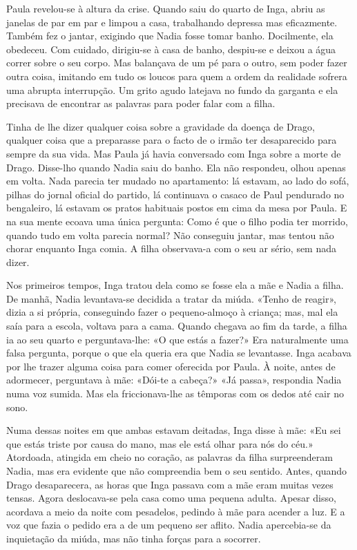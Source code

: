 Paula revelou-se à altura da crise. Quando saiu do quarto de Inga, abriu
as janelas de par em par e limpou a casa, trabalhando depressa mas
eficazmente. Também fez o jantar, exigindo que Nadia fosse tomar banho.
Docilmente, ela obedeceu. Com cuidado, dirigiu-se à casa de banho,
despiu-se e deixou a água correr sobre o seu corpo. Mas balançava de um
pé para o outro, sem poder fazer outra coisa, imitando em tudo os loucos
para quem a ordem da realidade sofrera uma abrupta interrupção. Um grito
agudo latejava no fundo da garganta e ela precisava de encontrar as
palavras para poder falar com a filha.

Tinha de lhe dizer qualquer coisa sobre a gravidade da doença de Drago,
qualquer coisa que a preparasse para o facto de o irmão ter desaparecido
para sempre da sua vida. Mas Paula já havia conversado com Inga sobre a
morte de Drago. Disse-lho quando Nadia saiu do banho. Ela não respondeu,
olhou apenas em volta. Nada parecia ter mudado no apartamento: lá
estavam, ao lado do sofá, pilhas do jornal oficial do partido, lá
continuava o casaco de Paul pendurado no bengaleiro, lá estavam os
pratos habituais postos em cima da mesa por Paula. E na sua mente ecoava
uma única pergunta: Como é que o filho podia ter morrido, quando tudo em
volta parecia normal? Não conseguiu jantar, mas tentou não chorar
enquanto Inga comia. A filha observava-a com o seu ar sério, sem
nada dizer.

Nos primeiros tempos, Inga tratou dela como se fosse ela a mãe e Nadia a
filha. De manhã, Nadia levantava-se decidida a tratar da miúda. «Tenho
de reagir», dizia a si própria, conseguindo fazer o pequeno-almoço à
criança; mas, mal ela saía para a escola, voltava para a cama. Quando
chegava ao fim da tarde, a filha ia ao seu quarto e perguntava-lhe: «O
que estás a fazer?» Era naturalmente uma falsa pergunta, porque o que
ela queria era que Nadia se levantasse. Inga acabava por lhe trazer
alguma coisa para comer oferecida por Paula. À noite, antes de adormecer, perguntava à mãe: «Dói-te a cabeça?» «Já passa», respondia Nadia
numa voz sumida. Mas ela friccionava-lhe as têmporas com os dedos até
cair no sono.

Numa dessas noites em que ambas estavam deitadas,
Inga disse à mãe: «Eu sei que estás triste por causa do
mano, mas ele está olhar para nós do céu.» Atordoada, atingida em cheio
no coração, as palavras da filha surpreenderam Nadia, mas era evidente
que não compreendia bem o seu sentido. Antes, quando Drago desaparecera,
as horas que Inga passava com a mãe eram muitas vezes tensas. Agora
deslocava-se pela casa como uma pequena adulta. Apesar disso, acordava a
meio da noite com pesadelos, pedindo à mãe para acender a luz. E a voz
que fazia o pedido era a de um pequeno ser aflito. Nadia apercebia-se da inquietação da miúda, mas não tinha forças para a socorrer.

